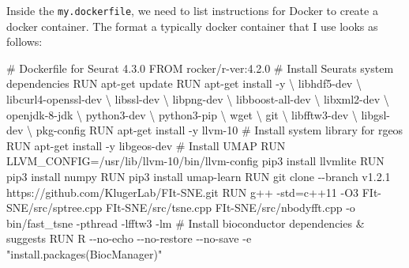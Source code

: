 \documentclass[
  letterpaper,
  DIV=11,
  numbers=noendperiod]{scrartcl}
\newenvironment{Shaded}{\begin{snugshade}}{\end{snugshade}}
\newcommand{\AttributeTok}[1]{\textcolor[rgb]{0.40,0.45,0.13}{#1}}
\newcommand{\CommentTok}[1]{\textcolor[rgb]{0.37,0.37,0.37}{#1}}
\newcommand{\DataTypeTok}[1]{\textcolor[rgb]{0.68,0.00,0.00}{#1}}
\newcommand{\ExtensionTok}[1]{\textcolor[rgb]{0.00,0.23,0.31}{#1}}
\newcommand{\FunctionTok}[1]{\textcolor[rgb]{0.28,0.35,0.67}{#1}}
\newcommand{\KeywordTok}[1]{\textcolor[rgb]{0.00,0.23,0.31}{#1}}
\newcommand{\NormalTok}[1]{\textcolor[rgb]{0.00,0.23,0.31}{#1}}
\newcommand{\OperatorTok}[1]{\textcolor[rgb]{0.37,0.37,0.37}{#1}}
\newcommand{\StringTok}[1]{\textcolor[rgb]{0.13,0.47,0.30}{#1}}
\newcommand{\VariableTok}[1]{\textcolor[rgb]{0.07,0.07,0.07}{#1}}
\begin{document}
Inside the \texttt{my.dockerfile}, we need to list instructions for
Docker to create a docker container. The format a typically docker
container that I use looks as follows:

\begin{Shaded}
\begin{Highlighting}[]
\CommentTok{\# Dockerfile for Seurat 4.3.0}
\KeywordTok{FROM}\NormalTok{ rocker/r{-}ver:4.2.0}
\CommentTok{\# Install Seurat\textquotesingle{}s system dependencies}
\KeywordTok{RUN} \ExtensionTok{apt{-}get}\NormalTok{ update}
\KeywordTok{RUN} \ExtensionTok{apt{-}get}\NormalTok{ install }\AttributeTok{{-}y} \DataTypeTok{\textbackslash{}}
\NormalTok{    libhdf5{-}dev }\DataTypeTok{\textbackslash{}}
\NormalTok{    libcurl4{-}openssl{-}dev }\DataTypeTok{\textbackslash{}}
\NormalTok{    libssl{-}dev }\DataTypeTok{\textbackslash{}}
\NormalTok{    libpng{-}dev }\DataTypeTok{\textbackslash{}}
\NormalTok{    libboost{-}all{-}dev }\DataTypeTok{\textbackslash{}}
\NormalTok{    libxml2{-}dev }\DataTypeTok{\textbackslash{}}
\NormalTok{    openjdk{-}8{-}jdk }\DataTypeTok{\textbackslash{}}
\NormalTok{    python3{-}dev }\DataTypeTok{\textbackslash{}}
\NormalTok{    python3{-}pip }\DataTypeTok{\textbackslash{}}
\NormalTok{    wget }\DataTypeTok{\textbackslash{}}
\NormalTok{    git }\DataTypeTok{\textbackslash{}}
\NormalTok{    libfftw3{-}dev }\DataTypeTok{\textbackslash{}}
\NormalTok{    libgsl{-}dev }\DataTypeTok{\textbackslash{}}
\NormalTok{    pkg{-}config}
\KeywordTok{RUN} \ExtensionTok{apt{-}get}\NormalTok{ install }\AttributeTok{{-}y}\NormalTok{ llvm{-}10}
\CommentTok{\# Install system library for rgeos}
\KeywordTok{RUN} \ExtensionTok{apt{-}get}\NormalTok{ install }\AttributeTok{{-}y}\NormalTok{ libgeos{-}dev}
\CommentTok{\# Install UMAP}
\KeywordTok{RUN} \VariableTok{LLVM\_CONFIG}\OperatorTok{=}\NormalTok{/usr/lib/llvm{-}10/bin/llvm{-}config }\ExtensionTok{pip3}\NormalTok{ install llvmlite}
\KeywordTok{RUN} \ExtensionTok{pip3}\NormalTok{ install numpy}
\KeywordTok{RUN} \ExtensionTok{pip3}\NormalTok{ install umap{-}learn}
\KeywordTok{RUN} \FunctionTok{git}\NormalTok{ clone }\AttributeTok{{-}{-}branch}\NormalTok{ v1.2.1 https://github.com/KlugerLab/FIt{-}SNE.git}
\KeywordTok{RUN} \ExtensionTok{g++} \AttributeTok{{-}std}\OperatorTok{=}\NormalTok{c++11 }\AttributeTok{{-}O3}\NormalTok{ FIt{-}SNE/src/sptree.cpp FIt{-}SNE/src/tsne.cpp FIt{-}SNE/src/nbodyfft.cpp  }\AttributeTok{{-}o}\NormalTok{ bin/fast\_tsne }\AttributeTok{{-}pthread} \AttributeTok{{-}lfftw3} \AttributeTok{{-}lm}
\CommentTok{\# Install bioconductor dependencies \& suggests}
\KeywordTok{RUN} \ExtensionTok{R} \AttributeTok{{-}{-}no{-}echo} \AttributeTok{{-}{-}no{-}restore} \AttributeTok{{-}{-}no{-}save} \AttributeTok{{-}e} \StringTok{"install.packages(\textquotesingle{}BiocManager\textquotesingle{})"}
\end{Highlighting}
\end{Shaded}
\end{document}
